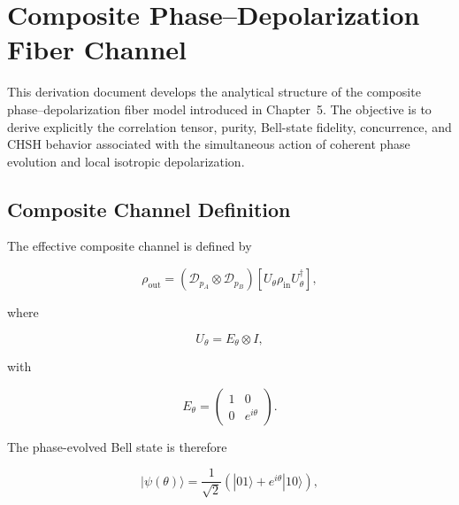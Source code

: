 
\section{Composite Phase--Depolarization Fiber Channel}

This derivation document develops the analytical structure of the composite phase--depolarization fiber model introduced in Chapter~5. The objective is to derive explicitly the correlation tensor, purity, Bell-state fidelity, concurrence, and CHSH behavior associated with the simultaneous action of coherent phase evolution and local isotropic depolarization.

\medskip


\subsection{Composite Channel Definition}

The effective composite channel is defined by

\begin{equation}
\rho_{\mathrm{out}}
=
\left(
\mathcal{D}_{p_A}
\otimes
\mathcal{D}_{p_B}
\right)
\left[
U_{\theta}
\rho_{\mathrm{in}}
U_{\theta}^{\dagger}
\right],
\label{eq:d5_composite_channel}
\end{equation}

where

\begin{equation}
U_{\theta}
=
E_{\theta}
\otimes
I,
\end{equation}

with

\begin{equation}
E_{\theta}
=
\begin{pmatrix}
1 & 0 \\
0 & e^{i\theta}
\end{pmatrix}.
\end{equation}

\medskip

The phase-evolved Bell state is therefore

\begin{equation}
|\psi(\theta)\rangle
=
\frac{1}{\sqrt{2}}
\left(
|01\rangle
+
e^{i\theta}|10\rangle
\right),
\label{eq:d5_phase_bell_state}
\end{equation}

